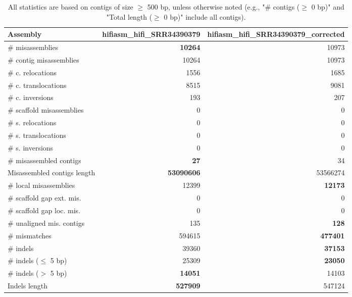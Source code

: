 \documentclass[12pt,a4paper]{article}
\begin{document}
\begin{table}[ht]
\begin{center}
\caption{All statistics are based on contigs of size $\geq$ 500 bp, unless otherwise noted (e.g., "\# contigs ($\geq$ 0 bp)" and "Total length ($\geq$ 0 bp)" include all contigs).}
\begin{tabular}{|l*{2}{|r}|}
\hline
Assembly & hifiasm\_hifi\_SRR34390379 & hifiasm\_hifi\_SRR34390379\_corrected \\ \hline
\# misassemblies & {\bf 10264} & 10973 \\ \hline
\hspace{2mm}\# contig misassemblies & 10264 & 10973 \\ \hline
\hspace{5mm}\# c. relocations & 1556 & 1685 \\ \hline
\hspace{5mm}\# c. translocations & 8515 & 9081 \\ \hline
\hspace{5mm}\# c. inversions & 193 & 207 \\ \hline
\hspace{2mm}\# scaffold misassemblies & 0 & 0 \\ \hline
\hspace{5mm}\# s. relocations & 0 & 0 \\ \hline
\hspace{5mm}\# s. translocations & 0 & 0 \\ \hline
\hspace{5mm}\# s. inversions & 0 & 0 \\ \hline
\# misassembled contigs & {\bf 27} & 34 \\ \hline
Misassembled contigs length & {\bf 53090606} & 53566274 \\ \hline
\# local misassemblies & 12399 & {\bf 12173} \\ \hline
\# scaffold gap ext. mis. & 0 & 0 \\ \hline
\# scaffold gap loc. mis. & 0 & 0 \\ \hline
\# unaligned mis. contigs & 135 & {\bf 128} \\ \hline
\# mismatches & 594615 & {\bf 477401} \\ \hline
\# indels & 39360 & {\bf 37153} \\ \hline
\hspace{5mm}\# indels ($\leq$ 5 bp) & 25309 & {\bf 23050} \\ \hline
\hspace{5mm}\# indels ($>$ 5 bp) & {\bf 14051} & 14103 \\ \hline
Indels length & {\bf 527909} & 547124 \\ \hline
\end{tabular}
\end{center}
\end{table}
\end{document}
